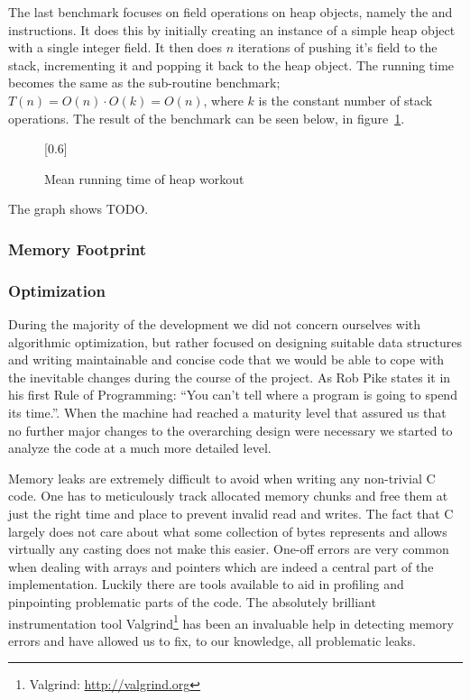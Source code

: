 The last benchmark focuses on field operations on heap objects, namely the
 and  instructions. It does
this by initially creating an instance of a simple heap object with a single
integer field. It then does $n$ iterations of pushing it's field to the stack,
incrementing it and popping it back to the heap object. The running time becomes
the same as the sub-routine benchmark; $T(n) = O(n) \cdot O(k) = O(n)$, where
$k$ is the constant number of stack operations. The result of the
benchmark can be seen below, in figure~\ref{fig:eval:benchmark:heap}.
\begin{figure}[H]
  \centering
  \scalebox{0.8}[0.6]{}
  \caption{Mean running time of heap workout}
\label{fig:eval:benchmark:heap}
\end{figure}

The graph shows TODO.


\subsubsection{Memory Footprint}

\subsubsection{Optimization}

During the majority of the development we did not concern ourselves with
algorithmic optimization, but rather focused on designing suitable data
structures and writing maintainable and concise code that we would be able to
cope with the inevitable changes during the course of the project. As Rob Pike
states it in his first Rule of Programming: ``You can't tell where a program is
going to spend its time.''\cite{pike-rules}. When the machine had reached a
maturity level that assured us that no further major changes to the overarching
design were necessary we started to analyze the code at a much more detailed
level.

Memory leaks are extremely difficult to avoid when writing any non-trivial C
code. One has to meticulously track allocated memory chunks and free them at
just the right time and place to prevent invalid read and writes. The fact that
C largely does not care about what some collection of bytes represents and
allows virtually any casting does not make this easier. One-off errors are very
common when dealing with arrays and pointers which are indeed a central part of
the \thename{} implementation. Luckily there are tools available to aid in
profiling and pinpointing problematic parts of the code. The absolutely
brilliant instrumentation tool Valgrind\footnote{Valgrind:
  \url{http://valgrind.org}} has been an invaluable help in detecting memory
errors and have allowed us to fix, to our knowledge, all problematic leaks.

